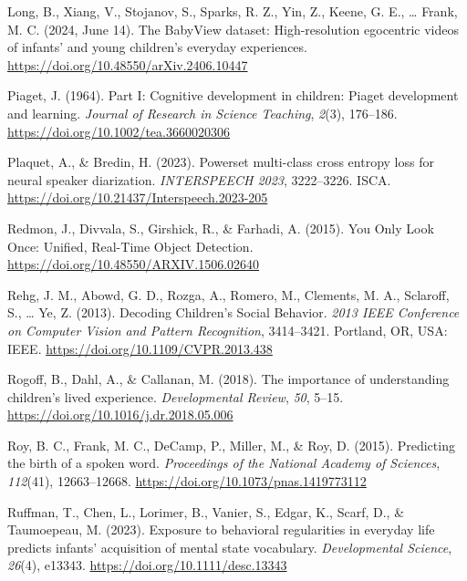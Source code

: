 \documentclass[
  man,floatsintext]{apa6}
\newlength{\cslhangindent}
\newenvironment{CSLReferences}[2] %
 {\begin{list}{}{%
  \setlength{\itemindent}{0pt}
  \setlength{\leftmargin}{0pt}
  \setlength{\parsep}{0pt}
  \ifodd #1
   \setlength{\leftmargin}{\cslhangindent}
   \setlength{\itemindent}{-1\cslhangindent}
  \fi
  \setlength{\itemsep}{#2\baselineskip}}}
 {\end{list}}
\begin{document}
\begin{CSLReferences}{1}{0}
Long, B., Xiang, V., Stojanov, S., Sparks, R. Z., Yin, Z., Keene, G. E., \ldots{} Frank, M. C. (2024, June 14). The {BabyView} dataset: {High-resolution} egocentric videos of infants' and young children's everyday experiences. \url{https://doi.org/10.48550/arXiv.2406.10447}

Piaget, J. (1964). Part {I}: {Cognitive} development in children: {Piaget} development and learning. \emph{Journal of Research in Science Teaching}, \emph{2}(3), 176--186. \url{https://doi.org/10.1002/tea.3660020306}

Plaquet, A., \& Bredin, H. (2023). Powerset multi-class cross entropy loss for neural speaker diarization. \emph{{INTERSPEECH} 2023}, 3222--3226. ISCA. \url{https://doi.org/10.21437/Interspeech.2023-205}

Redmon, J., Divvala, S., Girshick, R., \& Farhadi, A. (2015). You {Only Look Once}: {Unified}, {Real-Time Object Detection}. \url{https://doi.org/10.48550/ARXIV.1506.02640}

Rehg, J. M., Abowd, G. D., Rozga, A., Romero, M., Clements, M. A., Sclaroff, S., \ldots{} Ye, Z. (2013). Decoding {Children}'s {Social Behavior}. \emph{2013 {IEEE Conference} on {Computer Vision} and {Pattern Recognition}}, 3414--3421. Portland, OR, USA: IEEE. \url{https://doi.org/10.1109/CVPR.2013.438}

Rogoff, B., Dahl, A., \& Callanan, M. (2018). The importance of understanding children's lived experience. \emph{Developmental Review}, \emph{50}, 5--15. \url{https://doi.org/10.1016/j.dr.2018.05.006}

Roy, B. C., Frank, M. C., DeCamp, P., Miller, M., \& Roy, D. (2015). Predicting the birth of a spoken word. \emph{Proceedings of the National Academy of Sciences}, \emph{112}(41), 12663--12668. \url{https://doi.org/10.1073/pnas.1419773112}

Ruffman, T., Chen, L., Lorimer, B., Vanier, S., Edgar, K., Scarf, D., \& Taumoepeau, M. (2023). Exposure to behavioral regularities in everyday life predicts infants' acquisition of mental state vocabulary. \emph{Developmental Science}, \emph{26}(4), e13343. \url{https://doi.org/10.1111/desc.13343}


\end{CSLReferences}
\end{document}
